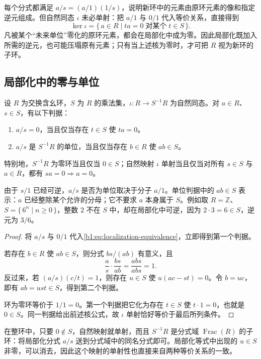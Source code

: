 每个分式都满足 \(a/s=(a/1)(1/s)\)，说明新环中的元素由原环元素的像和指定逆元组成。但自然同态 \(\iota\) 未必单射：把 \(a/1\) 与 \(0/1\) 代入等价关系，直接得到
\[
	\ker\iota=\{\,a\in R\mid ta=0\;\text{对某个}\;t\in S\,\}.
\]
凡被某个“未来单位”零化的原环元素，都会在局部化中成为零。因此局部化既加入所需的逆元，也可能压塌原有元素；只有当上述核为零时，才可把 \(R\) 视为新环的子环。

\subsection{局部化中的零与单位}
\label{b1:subsec:1302:02}

\begin{proposition}\label{b1:prop:localization-zero-unit}
	设 \(R\) 为交换含幺环，\(S\) 为 \(R\) 的乘法集，\(\iota:R\rightarrow S^{-1}R\) 为自然同态。对 \(a\in R\)、\(s\in S\)，有以下判据：
	\begin{enumerate}
		\item \(a/s=0\)，当且仅当存在 \(t\in S\) 使 \(ta=0\)。
		\item \(a/s\) 是 \(S^{-1}R\) 的单位，当且仅当存在 \(b\in R\) 使 \(ab\in S\)。
	\end{enumerate}
	特别地，\(S^{-1}R\) 为零环当且仅当 \(0\in S\)；自然映射 \(\iota\) 单射当且仅当对所有 \(s\in S\) 与 \(a\in R\)，都有 \(sa=0\Longrightarrow a=0\)。
\end{proposition}

由于 \(s/1\) 已经可逆，\(a/s\) 是否为单位取决于分子 \(a/1\)。单位判据中的 \(ab\in S\) 表示：\(a\) 已经整除某个允许的分母；它不要求 \(a\) 本身属于 \(S\)。例如取 \(R=\mathbb Z\)、\(S=\{\,6^n\mid n\geq0\,\}\)，整数 \(2\) 不在 \(S\) 中，却在局部化中可逆，因为 \(2\cdot3=6\in S\)，逆元为 \(3/6\)。

\begin{proof}
	将 \(a/s\) 与 \(0/1\) 代入\eqref{b1:eq:localization-equivalence}，立即得到第一个判据。

	若存在 \(b\in R\) 使 \(ab\in S\)，则分式 \(bs/(ab)\) 有意义，且
	\[
		\frac as\cdot\frac{bs}{ab}=\frac{abs}{abs}=1.
	\]
	反过来，若 \((a/s)(c/t)=1\)，则存在 \(u\in S\) 使 \(u(ac-st)=0\)。令 \(b=uc\)，即有 \(ab=ust\in S\)，得到第二个判据。

	环为零环等价于 \(1/1=0\)。第一个判据把它化为存在 \(t\in S\) 使 \(t\cdot1=0\)，也就是 \(0\in S\)。同一判据给出前述核公式，故 \(\iota\) 单射恰好等价于最后所列条件。
\end{proof}

在整环中，只要 \(0\notin S\)，自然映射就单射，而且 \(S^{-1}R\) 是分式域 \(\operatorname{Frac}(R)\) 的子环：将局部化分式 \(a/s\) 送到分式域中的同名分式即可。局部化等式中出现的 \(u\in S\) 非零，可以消去，因此这个映射的单射性也直接来自两种等价关系的一致。

